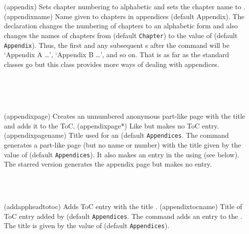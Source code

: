\begin{syntax}
\cmd{\appendix} \\
\cmd{\appendixname} \\
\end{syntax}
\glossary(appendix)%
  {}%
  {Sets chapter numbering to alphabetic and sets the chapter name to
   .}
\glossary(appendixname)%
  {}%
  {Name given to chapters in appendices (default Appendix).}
The \cmd{\appendix} declaration changes the numbering of
chapters to an alphabetic form and also changes
the names of chapters from \cmd{\chaptername} (default \texttt{Chapter})
to the value of \cmd{\appendixname} (default \texttt{Appendix}).
Thus, the first and any subsequent \cmd{\chapter}s after
the \cmd{\appendix} command
will be `Appendix A \ldots', `Appendix B \ldots', and so on.
That is as far as the standard classes go but this class provides more ways
of dealing with appendices.

\begin{syntax}
\cmd{\appendixpage}\\
\cmd{\appendixpage*}\\
\cmd{\appendixpagename}\\
\end{syntax}
\glossary(appendixpage)
  {}%
  {Creates an unnumbered anonymous  part-like page with the title  and adds it to the ToC.}
\glossary(appendixpage*)
  {}%
  {Like  but makes no ToC entry.}
\glossary(appendixpagename)
  {}%
  {Title used for an  (default \texttt{Appendices}.}
The \cmd{\appendixpage} command generates a part-like page (but no name
or number) with the title given by the value of \cmd{\appendixpagename}
(default \texttt{Appendices}). It also makes an entry in
the \toc{} using
\cmd{\addappheadtotoc} (see below). The starred version generates the
appendix page but makes no \toc{} entry.

\begin{syntax}
\cmd{\addappheadtotoc}\\
\cmd{\appendixtocname}\\
\end{syntax}
\glossary(addappheadtotoc)%
  {}%
  {Adds ToC entry with the title .}
\glossary(appendixtocname)%
  {}%
  {Title of ToC entry added by  (default \texttt{Appendices}.}
The command \cmd{\addappheadtotoc} adds an entry to the \toc. The title is
given by the value of \cmd{\appendixtocname} (default \texttt{Appendices}).

